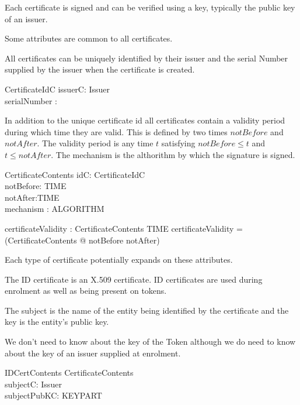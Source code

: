 Each certificate is signed and can be verified using a key, typically the
public key of an issuer. 

Some attributes are common to all certificates. 

All certificates can be uniquely identified by their issuer and the
serial Number supplied by the issuer when the certificate is created.

\begin{schema}{CertificateIdC}
	issuerC: Issuer
\\      serialNumber : \nat
\end{schema}

In addition to the unique certificate id all certificates contain a
validity period during which time they are valid. 
This is defined by two times $notBefore$ and $notAfter$. The validity
period is any time $t$ satisfying $notBefore \leq t$ and $t \leq notAfter$. 
The mechanism is the althorithm by which the signature is signed.

\begin{schema}{CertificateContents}
        idC: CertificateIdC
\\      notBefore: TIME
\\      notAfter:TIME
\\      mechanism : ALGORITHM
\end{schema}

\begin{axdef}
        certificateValidity : CertificateContents \fun \power TIME
\where 
        certificateValidity = (\lambda CertificateContents @ 
        notBefore \upto notAfter)
\end{axdef}

Each type of certificate potentially expands on these attributes.

The ID certificate is an X.509 certificate. ID certificates are used
during enrolment as well as being present on tokens.

The subject is the name of the entity being identified by the
certificate and the key is the entity's public key. 

We don't need to know about the key of the Token although we do need
to know about the key of an issuer supplied at enrolment.

\begin{schema}{IDCertContents}
	CertificateContents
\\      subjectC: Issuer
\\      subjectPubKC: KEYPART
\end{schema}

